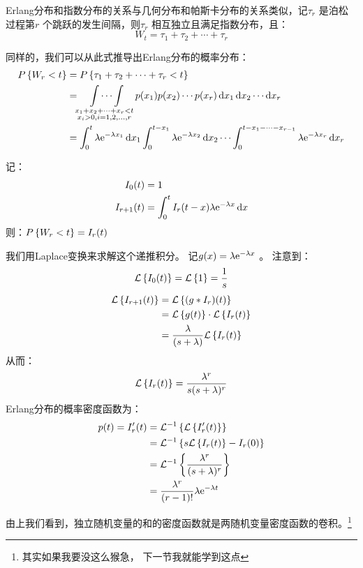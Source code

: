 Erlang分布和指数分布的关系与几何分布和帕斯卡分布的关系类似，记\(\tau_{r}\) 是泊松过程第\(r\)
个跳跃的发生间隔，则\(\tau_{r}\) 相互独立且满足指数分布，且：
\[
    W_{t} = \tau_{1} + \tau_{2} + \cdots + \tau_{r}
\]

同样的，我们可以从此式推导出Erlang分布的概率分布：
\begin{align*}
    \P{W_{r}<t} &= \P{\tau_{1}+\tau_{2}+\cdots+\tau_{r}<t} \\
    &= \idotsint\limits_{\substack{x_{1}+x_{2}+\dots +x_{r}<t
    \\ x_{i}>0, i=1,2,\ldots,r}} p(x_{1}) p(x_{2}) \cdots p(x_{r})
    \d{x}_{1} \d{x}_{2} \cdots \d{x}_{r} \\
    &=\int_{0}^{t} \lambda \e^{-\lambda x_{1}} \d{x_{1}}
    \int_{0}^{t-x_{1}} \lambda \e^{-\lambda x_{2}} \d{x_{2}} \cdots
    \int_{0}^{t-x_{1}-\cdots-x_{r-1}} \lambda \e^{-\lambda
    x_{r}} \d{x_{r}} \\
\end{align*}

记：
\begin{align*}
    I_{0}(t) &= 1\\
    I_{r+1}(t) &= \int_{0}^{t} I_{r}(t-x) \lambda
    \e^{-\lambda x} \d{x}
    \end{align*}
则：\(\P{W_{r}<t} = I_{r}(t)\)

我们用Laplace变换来求解这个递推积分。
记\(g(x) = \lambda \e^{-\lambda x} \) 。
注意到：
\[
    \L{I_{0}(t)} = \L{1} = \frac{1}{s} \\
\]
\begin{align*}
    \L{I_{r+1}(t)} &= \L{(g * I_{r})(t)} \\
    &= \L{g(t)} \cdot \L{I_{r}(t)} \\
    &= \frac{\lambda}{(s+\lambda)} \L{I_{r}(t)}\\
\end{align*}
从而：\[
    \L{I_{r}(t)} = \frac{\lambda^{r}}{s(s+\lambda)^{r}} \\
\]
Erlang分布的概率密度函数为：
\begin{align*}
    p(t) = I_{r}'(t) &= \invL{\L{I_{r}'(t)}} \\
    &= \invL{s\L{I_{r}(t)} - I_{r}(0)} \\
    &= \invL{\frac{\lambda^{r}}{(s+\lambda)^{r}}} \\
    &= \frac{\lambda^{r}}{(r-1)!} \lambda \e^{-\lambda t} \\
\end{align*}

由上我们看到，独立随机变量的和的密度函数就是两随机变量密度函数的卷积。\footnote{其实如果我要没这么猴急，
下一节我就能学到这点}

